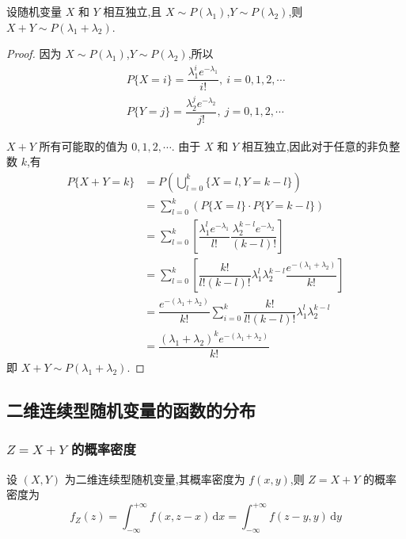 \begin{conclusion}
    设随机变量 $X$ 和 $Y$ 相互独立,且 $X \sim P(\lambda_1)$,$Y \sim P(\lambda_2)$,则 $X+Y \sim P(\lambda_1 + \lambda_2)$.
\end{conclusion}

\begin{proof}
    因为 $X \sim P(\lambda_1)$,$Y \sim P(\lambda_2)$,所以
    \begin{gather*}
        P\{X=i\} = \dfrac{\lambda_1^i e^{-\lambda_1}}{i!},\ i=0,1,2,\cdots \\[0.5em]
        P\{Y=j\} = \dfrac{\lambda_2^j e^{-\lambda_2}}{j!},\ j=0,1,2,\cdots
    \end{gather*}

    $X+Y$ 所有可能取的值为 $0,1,2,\cdots$. 由于 $X$ 和 $Y$ 相互独立,因此对于任意的非负整数 $k$,有
    $$
    \begin{aligned}
        P\{X+Y=k\} &= P(\bigcup_{l=0}^k \{X=l, Y=k-l\}) \\
        &= \sum_{l=0}^k (P\{X=l\} \cdot P\{Y=k-l\}) \\
        &= \sum_{l=0}^k \left[ \dfrac{\lambda_1^l e^{-\lambda_1}}{l!} \dfrac{\lambda_2^{k-l} e^{-\lambda_2}}{(k-l)!} \right] \\
        &= \sum_{l=0}^k \left[ \dfrac{k!}{l!(k-l)!} \lambda_1^l \lambda_2^{k-l} \dfrac{e^{-(\lambda_1 + \lambda_2)}}{k!} \right] \\
        &= \dfrac{e^{-(\lambda_1 + \lambda_2)}}{k!} \sum_{i=0}^k \dfrac{k!}{l!(k-l)!} \lambda_1^l \lambda_2^{k-l} \\
        &= \dfrac{(\lambda_1 + \lambda_2)^k e^{-(\lambda_1 + \lambda_2)}}{k!}
    \end{aligned}
    $$
    即 $X+Y \sim P(\lambda_1 + \lambda_2)$.
\end{proof}

\subsection{二维连续型随机变量的函数的分布}

\subsubsection{\texorpdfstring{$Z=X+Y$}{} 的概率密度}

\begin{conclusion}
    设 $(X,Y)$ 为二维连续型随机变量,其概率密度为 $f(x,y)$,则 $Z=X+Y$ 的概率密度为
    $$
    f_{Z}(z) = \int_{-\infty}^{+\infty} f(x,z-x) \, \text{d}x = \int_{-\infty}^{+\infty} f(z-y,y) \, \text{d}y
    $$
\end{conclusion}

